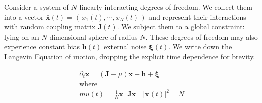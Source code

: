 Consider a system of $N$ linearly interacting degrees of freedom. We collect them into a vector $\mathbf{\bar x}(t) = \left(\,x_1(t),\cdots, x_N(t)\,\right)$ and represent their interactions with random coupling matrix $\mathbf{J}(t)$. We subject them to a global constraint: lying on an $N$-dimensional sphere of radius $N$. These degrees of freedom may also experience constant bias $\mathbf{h}(t)$ external noise $\boldsymbol\xi(t)$. We write down the Langevin Equation of motion, dropping the explicit time dependence for brevity.

\begin{align}
\partial_t\mathbf{\bar x} = (\mathbf{J}-\mu)\mathbf{\bar x}+\mathbf{h}+\boldsymbol\xi \\
\mathrm{where}\\mu(t)=\frac{1}{N}\mathbf{\bar x}^{\top}\mathbf{J}\mathbf{\bar x}\quad|\mathbf{\bar x}(t)|^2=N
\end{align}